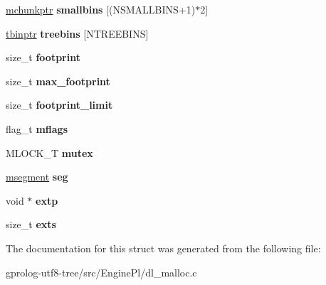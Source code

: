 \begin{DoxyCompactItemize}
\item 
\hyperlink{structmalloc__chunk}{mchunkptr} {\bfseries smallbins} \mbox{[}(N\+S\+M\+A\+L\+L\+B\+I\+NS+1)$\ast$2\mbox{]}\hypertarget{structmalloc__state_ade50b83b94e4f09d372a18ae51c13f70}{}\label{structmalloc__state_ade50b83b94e4f09d372a18ae51c13f70}

\item 
\hyperlink{structmalloc__tree__chunk}{tbinptr} {\bfseries treebins} \mbox{[}N\+T\+R\+E\+E\+B\+I\+NS\mbox{]}\hypertarget{structmalloc__state_a7ccf88dffa5e3287b7c9dd290ea1a0cb}{}\label{structmalloc__state_a7ccf88dffa5e3287b7c9dd290ea1a0cb}

\item 
size\+\_\+t {\bfseries footprint}\hypertarget{structmalloc__state_a77ec93dc40bb85bd7a3c4e9b26547d11}{}\label{structmalloc__state_a77ec93dc40bb85bd7a3c4e9b26547d11}

\item 
size\+\_\+t {\bfseries max\+\_\+footprint}\hypertarget{structmalloc__state_ac5c720358079598dfb5d699124e761c8}{}\label{structmalloc__state_ac5c720358079598dfb5d699124e761c8}

\item 
size\+\_\+t {\bfseries footprint\+\_\+limit}\hypertarget{structmalloc__state_ab589c6129376d79aab99babfe55fe048}{}\label{structmalloc__state_ab589c6129376d79aab99babfe55fe048}

\item 
flag\+\_\+t {\bfseries mflags}\hypertarget{structmalloc__state_a44ff83ca07796cad96f2289471c88d2d}{}\label{structmalloc__state_a44ff83ca07796cad96f2289471c88d2d}

\item 
M\+L\+O\+C\+K\+\_\+T {\bfseries mutex}\hypertarget{structmalloc__state_aafbde3a2fbb7df9480eb14521e5624da}{}\label{structmalloc__state_aafbde3a2fbb7df9480eb14521e5624da}

\item 
\hyperlink{structmalloc__segment}{msegment} {\bfseries seg}\hypertarget{structmalloc__state_a899c69eca79f165b03913063a93d973a}{}\label{structmalloc__state_a899c69eca79f165b03913063a93d973a}

\item 
void $\ast$ {\bfseries extp}\hypertarget{structmalloc__state_aa605a719561fc44ce2ce7165e6dcb897}{}\label{structmalloc__state_aa605a719561fc44ce2ce7165e6dcb897}

\item 
size\+\_\+t {\bfseries exts}\hypertarget{structmalloc__state_af3c1e272f4107a5006ee10429cb2232a}{}\label{structmalloc__state_af3c1e272f4107a5006ee10429cb2232a}

\end{DoxyCompactItemize}


The documentation for this struct was generated from the following file\+:\begin{DoxyCompactItemize}
\item 
gprolog-\/utf8-\/tree/src/\+Engine\+Pl/dl\+\_\+malloc.\+c\end{DoxyCompactItemize}
